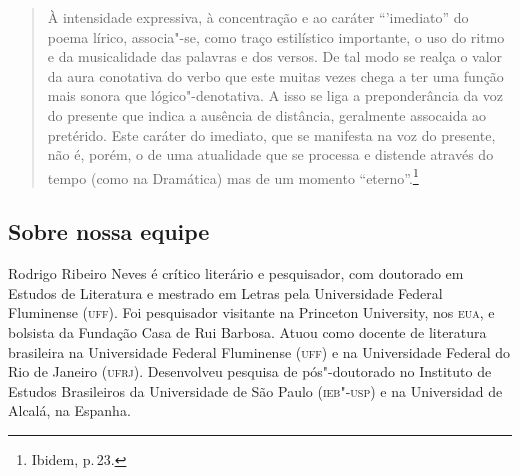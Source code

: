 \begin{quote}
À intensidade expressiva, à concentração e ao caráter ``'imediato'' do poema lírico, associa"-se, como traço estilístico importante, o uso do ritmo e da musicalidade das palavras e dos versos. De tal modo se realça o valor da aura conotativa do verbo que este muitas vezes chega a ter uma função mais sonora que lógico"-denotativa. A isso se liga a preponderância da voz do presente que indica a ausência de distância, geralmente assocaida ao pretérido. Este caráter do imediato, que se manifesta na voz do presente, não é, porém, o de uma atualidade que se processa e distende através do tempo (como na Dramática) mas de um momento ``eterno''.\footnote{Ibidem, p.\,23.}
\end{quote}



\subsection{Sobre nossa equipe}

Rodrigo Ribeiro Neves é crítico literário e pesquisador, com doutorado em Estudos de Literatura e mestrado em Letras pela Universidade Federal Fluminense (\textsc{uff}). Foi pesquisador visitante na Princeton University, nos \textsc{eua}, e bolsista da Fundação Casa de Rui Barbosa. Atuou como docente de literatura brasileira na Universidade Federal Fluminense (\textsc{uff}) e na Universidade Federal do Rio de Janeiro (\textsc{ufrj}). Desenvolveu pesquisa de pós"-doutorado no Instituto de Estudos Brasileiros da Universidade de São Paulo (\textsc{ieb"-usp}) e na Universidad de Alcalá, na Espanha.